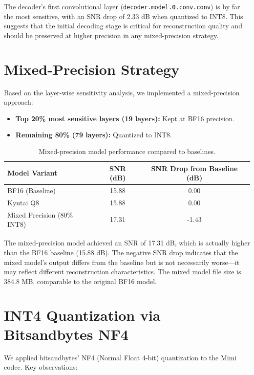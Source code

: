 \documentclass[12pt,a4paper]{report}
\begin{document}
The decoder's first convolutional layer (\texttt{decoder.model.0.conv.conv}) is by far the most sensitive, with an SNR drop of 2.33 dB when quantized to INT8. This suggests that the initial decoding stage is critical for reconstruction quality and should be preserved at higher precision in any mixed-precision strategy.

\section{Mixed-Precision Strategy}

Based on the layer-wise sensitivity analysis, we implemented a mixed-precision approach:
\begin{itemize}
    \item \textbf{Top 20\% most sensitive layers (19 layers):} Kept at BF16 precision.
    \item \textbf{Remaining 80\% (79 layers):} Quantized to INT8.
\end{itemize}

\begin{table}[H]
\centering
\caption{Mixed-precision model performance compared to baselines.}
\label{tab:mixed_precision}
\begin{tabular}{@{}lcc@{}}
\toprule
\textbf{Model Variant} & \textbf{SNR (dB)} & \textbf{SNR Drop from Baseline (dB)} \\
\midrule
BF16 (Baseline) & 15.88 & 0.00 \\
Kyutai Q8 & 15.88 & 0.00 \\
Mixed Precision (80\% INT8) & 17.31 & -1.43 \\
\bottomrule
\end{tabular}
\end{table}

The mixed-precision model achieved an SNR of 17.31 dB, which is actually higher than the BF16 baseline (15.88 dB). The negative SNR drop indicates that the mixed model's output differs from the baseline but is not necessarily worse---it may reflect different reconstruction characteristics. The mixed model file size is 384.8 MB, comparable to the original BF16 model.

\section{INT4 Quantization via Bitsandbytes NF4}

We applied bitsandbytes' NF4 (Normal Float 4-bit) quantization to the Mimi codec. Key observations:
\end{document}
